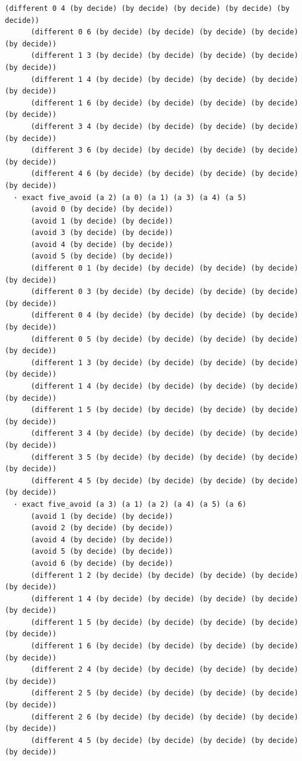 \documentclass[11pt,a4paper]{article}
\begin{document}
\begin{Verbatim}[breaklines,breakanywhere,fontsize=\footnotesize]
      (different 0 4 (by decide) (by decide) (by decide) (by decide) (by decide))
      (different 0 6 (by decide) (by decide) (by decide) (by decide) (by decide))
      (different 1 3 (by decide) (by decide) (by decide) (by decide) (by decide))
      (different 1 4 (by decide) (by decide) (by decide) (by decide) (by decide))
      (different 1 6 (by decide) (by decide) (by decide) (by decide) (by decide))
      (different 3 4 (by decide) (by decide) (by decide) (by decide) (by decide))
      (different 3 6 (by decide) (by decide) (by decide) (by decide) (by decide))
      (different 4 6 (by decide) (by decide) (by decide) (by decide) (by decide))
  · exact five_avoid (a 2) (a 0) (a 1) (a 3) (a 4) (a 5)
      (avoid 0 (by decide) (by decide))
      (avoid 1 (by decide) (by decide))
      (avoid 3 (by decide) (by decide))
      (avoid 4 (by decide) (by decide))
      (avoid 5 (by decide) (by decide))
      (different 0 1 (by decide) (by decide) (by decide) (by decide) (by decide))
      (different 0 3 (by decide) (by decide) (by decide) (by decide) (by decide))
      (different 0 4 (by decide) (by decide) (by decide) (by decide) (by decide))
      (different 0 5 (by decide) (by decide) (by decide) (by decide) (by decide))
      (different 1 3 (by decide) (by decide) (by decide) (by decide) (by decide))
      (different 1 4 (by decide) (by decide) (by decide) (by decide) (by decide))
      (different 1 5 (by decide) (by decide) (by decide) (by decide) (by decide))
      (different 3 4 (by decide) (by decide) (by decide) (by decide) (by decide))
      (different 3 5 (by decide) (by decide) (by decide) (by decide) (by decide))
      (different 4 5 (by decide) (by decide) (by decide) (by decide) (by decide))
  · exact five_avoid (a 3) (a 1) (a 2) (a 4) (a 5) (a 6)
      (avoid 1 (by decide) (by decide))
      (avoid 2 (by decide) (by decide))
      (avoid 4 (by decide) (by decide))
      (avoid 5 (by decide) (by decide))
      (avoid 6 (by decide) (by decide))
      (different 1 2 (by decide) (by decide) (by decide) (by decide) (by decide))
      (different 1 4 (by decide) (by decide) (by decide) (by decide) (by decide))
      (different 1 5 (by decide) (by decide) (by decide) (by decide) (by decide))
      (different 1 6 (by decide) (by decide) (by decide) (by decide) (by decide))
      (different 2 4 (by decide) (by decide) (by decide) (by decide) (by decide))
      (different 2 5 (by decide) (by decide) (by decide) (by decide) (by decide))
      (different 2 6 (by decide) (by decide) (by decide) (by decide) (by decide))
      (different 4 5 (by decide) (by decide) (by decide) (by decide) (by decide))

\end{Verbatim}
\end{document}
